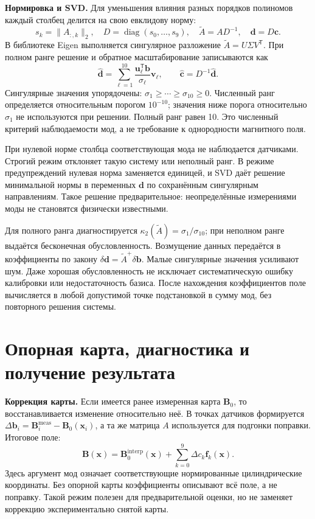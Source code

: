 \documentclass[a4paper,11pt]{article}
\begin{document}
\textbf{Нормировка и SVD.} Для уменьшения влияния разных порядков полиномов
каждый столбец делится на свою евклидову норму:
\[
 s_k=\|A_{:,k}\|_2,\quad D=\operatorname{diag}(s_0,\ldots,s_9),\quad
 \widetilde A=AD^{-1},\quad \mathbf d=D\mathbf c.
\]
В библиотеке Eigen выполняется сингулярное разложение
$\widetilde A=U\Sigma V^{\mathsf T}$.
При полном ранге решение и обратное масштабирование записываются как
\[
 \widehat{\mathbf d}=
 \sum_{\ell=1}^{10}\frac{\mathbf u_\ell^{\mathsf T}\mathbf b}{\sigma_\ell}
 \mathbf v_\ell,\qquad
 \widehat{\mathbf c}=D^{-1}\widehat{\mathbf d}.
\]
Сингулярные значения упорядочены:
$\sigma_1\geq\cdots\geq\sigma_{10}\geq0$.
Численный ранг определяется относительным порогом $10^{-10}$;
значения ниже порога относительно $\sigma_1$ не используются при решении.
Полный ранг равен 10. Это численный критерий наблюдаемости мод,
а не требование к однородности магнитного поля.

При нулевой норме столбца соответствующая мода не наблюдается датчиками.
Строгий режим отклоняет такую систему или неполный ранг.
В режиме предупреждений нулевая норма заменяется единицей,
и SVD даёт решение минимальной нормы в переменных $\mathbf d$
по сохранённым сингулярным направлениям. Такое решение предварительное:
неопределённые измерениями моды не становятся физически известными.

Для полного ранга диагностируется
$\kappa_2(\widetilde A)=\sigma_1/\sigma_{10}$; при неполном ранге
выдаётся бесконечная обусловленность. Возмущение данных передаётся
в коэффициенты по закону $\delta\mathbf d=\widetilde A^+\delta\mathbf b$.
Малые сингулярные значения усиливают шум. Даже хорошая обусловленность
не исключает систематическую ошибку калибровки или недостаточность базиса.
После нахождения коэффициентов поле вычисляется в любой допустимой
точке подстановкой в сумму мод, без повторного решения системы.

\clearpage
\section{Опорная карта, диагностика и получение результата}

\textbf{Коррекция карты.} Если имеется ранее измеренная карта $\mathbf B_0$,
то восстанавливается изменение относительно неё. В точках датчиков
формируется $\Delta\mathbf b_i=\mathbf B_i^{\mathrm{meas}}-\mathbf B_0(\mathbf x_i)$,
а та же матрица $A$ используется для подгонки поправки. Итоговое поле:
\[
 \mathbf B(\mathbf x)=\mathbf B_0^{\mathrm{interp}}(\mathbf x)
       +\sum_{k=0}^{9}\Delta c_k\mathbf f_k(\mathbf x).
\]
Здесь аргумент мод означает соответствующие нормированные цилиндрические
координаты. Без опорной карты коэффициенты описывают всё поле, а не поправку.
Такой режим полезен для предварительной оценки, но не заменяет коррекцию
экспериментально снятой карты.
\end{document}
